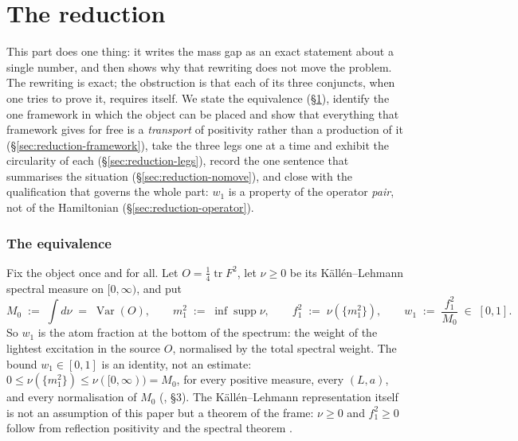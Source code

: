 \clearpage
\part{The reduction}
\label{part:reduction}

This part does one thing: it writes the mass gap as an exact statement about a single number, and
then shows why that rewriting does not move the problem. The rewriting is exact; the obstruction is
that each of its three conjuncts, when one tries to prove it, requires itself. We state the
equivalence (\S\ref{sec:reduction-equiv}), identify the one framework in which the object can be
placed and show that everything that framework gives for free is a \emph{transport} of positivity
rather than a production of it (\S\ref{sec:reduction-framework}), take the three legs one at a time
and exhibit the circularity of each (\S\ref{sec:reduction-legs}), record the one sentence that
summarises the situation (\S\ref{sec:reduction-nomove}), and close with the qualification that
governs the whole part: $w_1$ is a property of the operator \emph{pair}, not of the Hamiltonian
(\S\ref{sec:reduction-operator}).

\section{The equivalence}
\label{sec:reduction-equiv}

Fix the object once and for all. Let $O=\tfrac14\operatorname{tr}F^2$, let $\nu\ge 0$ be its
K\"all\'en--Lehmann spectral measure on $[0,\infty)$, and put
\begin{equation}
  M_0 \;:=\; \int d\nu \;=\; \operatorname{Var}(O),\qquad
  m_1^2 \;:=\; \inf\operatorname{supp}\nu,\qquad
  f_1^2 \;:=\; \nu(\{m_1^2\}),\qquad
  w_1 \;:=\; \frac{f_1^2}{M_0}\;\in\;[0,1].
  \label{eq:w1}
\end{equation}
So $w_1$ is the atom fraction at the bottom of the spectrum: the weight of the lightest excitation
in the source $O$, normalised by the total spectral weight. The bound $w_1\in[0,1]$ is an identity,
not an estimate: $0\le \nu(\{m_1^2\})\le\nu([0,\infty))=M_0$, for every positive measure, every
$(L,a)$, and every normalisation of $M_0$
(, \S3). The K\"all\'en--Lehmann representation itself is not an
assumption of this paper but a theorem of the frame: $\nu\ge0$ and $f_1^2\ge0$ follow from
reflection positivity and the spectral theorem \cite{kl,os1973}.

